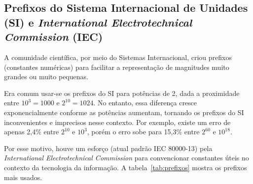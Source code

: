 \documentclass[12pt]{article}
\begin{document}
\subsection[Prefixos de unidades do SI e IEC]{Prefixos do Sistema Internacional de Unidades (SI) e \textit{International Electrotechnical Commission} (IEC)}

A comunidade científica, por meio do Sistemas Internacional, criou prefixos (constantes numéricas) para facilitar a representação de magnitudes muito grandes ou muito pequenas.

Era comum usar-se os prefixos do SI para potências de 2, dada a proximidade entre \(10^3=1000\) e \(2^{10}=1024\). No entanto, essa diferença cresce exponencialmente conforme as potências aumentam, tornando os prefixos do SI inconvenientes e imprecisos nesse contexto. Por exemplo, existe um erro de apenas 2,4\% entre \(2^{10}\) e \(10^3\), porém o erro sobe para 15,3\% entre \(2^{60}\) e \(10^{18}\).

Por esse motivo, houve um esforço (atual padrão IEC 80000-13) pela \textit{International Electrotechnical Commission} para convencionar constantes úteis no contexto da tecnologia da informação. A tabela~\ref{tab:prefixos} mostra os prefixos mais usados.
\end{document}
